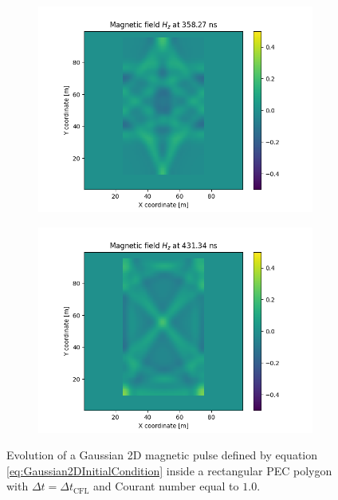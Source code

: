 \documentclass[12pt, oneside]{book}
\begin{document}
\begin{figure}[H]
    
    \begin{subfigure}[b]{0.49\textwidth}
        \centering
        \includegraphics[width=\textwidth]{Imagenes/CFDTD2D_GaussianStability5.png}
    \end{subfigure}
    \begin{subfigure}[b]{0.49\textwidth}
        \centering
        \includegraphics[width=\textwidth]{Imagenes/CFDTD2D_GaussianStability6.png}
    \end{subfigure}
    \caption{Evolution of a Gaussian 2D magnetic pulse defined by equation \ref{eq:Gaussian2DInitialCondition} inside a rectangular PEC polygon with $\Delta t = \Delta t_{\text{CFL}}$ and Courant number equal to $1.0$.}
    \label{fig:CFDTD2D_GaussianStability}
\end{figure}
\end{document}
